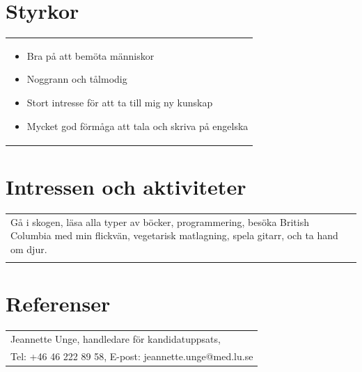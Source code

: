 \documentclass[11pt,a4paper]{article}
\begin{document}
\section{Styrkor}
\begin{tabularx}{\textwidth}{X}
	\vspace{-7pt}
	\begin{itemize}[leftmargin=0.8em]
		\item Bra på att bemöta människor
		\item Noggrann och tålmodig
		\item Stort intresse för att ta till mig ny kunskap
		\item Mycket god förmåga att tala och skriva på engelska
	\end{itemize}
\end{tabularx}

\section{Intressen och aktiviteter}
\begin{tabularx}{\textwidth}{X}
Gå i skogen, läsa alla typer av böcker, programmering, besöka British Columbia med min flickvän, vegetarisk matlagning, spela gitarr, och ta hand om djur.\\
\\
\end{tabularx}


\section{Referenser}
\begin{tabularx}{\textwidth}{X}
Jeannette Unge, handledare för kandidatuppsats,\\ Tel: +46 46 222 89 58, E-post: jeannette.unge@med.lu.se
\\
\end{tabularx}
\end{document}
